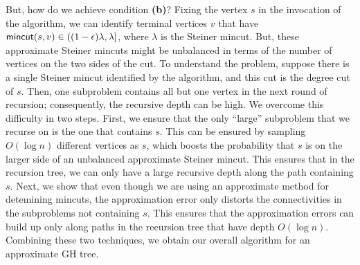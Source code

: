 But, how do we achieve condition {\bf (b)}? Fixing the vertex $s$ in the invocation of the \ssc algorithm, we can identify terminal vertices $v$ that have $\textsf{\textup{mincut}}(s, v)\in ((1-\epsilon)\lambda, \lambda]$, where $\lambda$ is the Steiner mincut. But, these approximate Steiner mincuts might be unbalanced in terms of the number of vertices on the two sides of the cut. To understand the problem, suppose there is a single Steiner mincut identified by the \ct algorithm, and this cut is the degree cut of $s$. Then, one subproblem contains all but one vertex in the next round of recursion; consequently, the recursive depth can be high. We overcome this difficulty in two steps. First, we ensure that the only ``large'' subproblem that we recurse on is the one that contains $s$. This can be ensured by sampling $O(\log n)$ different vertices as $s$, which boosts the probability that $s$ is on the larger side of an unbalanced approximate Steiner mincut. This ensures that in the recursion tree, we can only have a large recursive depth along the path containing $s$. Next, we show that even though we are using an approximate method for detemining mincuts, the approximation error only distorts the connectivities in the subproblems not containing $s$. This ensures that the approximation errors can build up only along paths in the recursion tree that have depth $O(\log n)$. Combining these two techniques, we obtain our overall algorithm for an approximate GH tree.